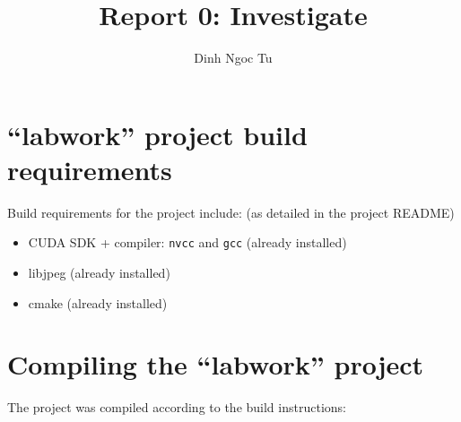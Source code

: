 \documentclass[12pt]{article}
\title{Report 0: Investigate}
\author{Dinh Ngoc Tu}
\begin{document}
\maketitle


\section{``labwork'' project build requirements}

Build requirements for the project include: (as detailed in the project README)
\begin{itemize}
    \item CUDA SDK + compiler: \verb|nvcc| and \verb|gcc| (already installed)
    \item libjpeg (already installed)
    \item cmake (already installed)
\end{itemize}


\section{Compiling the ``labwork'' project}

The project was compiled according to the build instructions:
\end{document}
